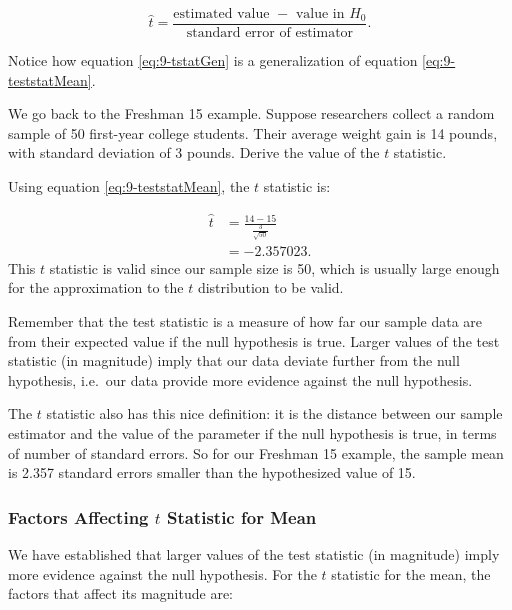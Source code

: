 \documentclass[
]{book}
\begin{document}
\begin{equation} 
\hat{t} =  \frac{\text{estimated value }- \text{ value in } H_0}{\text{standard error of estimator}}.
\label{eq:9-tstatGen}
\end{equation}

Notice how equation \eqref{eq:9-tstatGen} is a generalization of equation \eqref{eq:9-teststatMean}.

We go back to the Freshman 15 example. Suppose researchers collect a random sample of 50 first-year college students. Their average weight gain is 14 pounds, with standard deviation of 3 pounds. Derive the value of the \(t\) statistic.

Using equation \eqref{eq:9-teststatMean}, the \(t\) statistic is:

\[
\begin{split}
\hat{t} &= \frac{14-15}{\frac{3}{\sqrt{50}}} \\
        &= -2.357023.
\end{split}
\]
This \(t\) statistic is valid since our sample size is 50, which is usually large enough for the approximation to the \(t\) distribution to be valid.

Remember that the test statistic is a measure of how far our sample data are from their expected value if the null hypothesis is true. Larger values of the test statistic (in magnitude) imply that our data deviate further from the null hypothesis, i.e.~our data provide more evidence against the null hypothesis.

The \(t\) statistic also has this nice definition: it is the distance between our sample estimator and the value of the parameter if the null hypothesis is true, in terms of number of standard errors. So for our Freshman 15 example, the sample mean is 2.357 standard errors smaller than the hypothesized value of 15.

\subsubsection{\texorpdfstring{Factors Affecting \(t\) Statistic for Mean}{Factors Affecting t Statistic for Mean}}\label{factors}

We have established that larger values of the test statistic (in magnitude) imply more evidence against the null hypothesis. For the \(t\) statistic for the mean, the factors that affect its magnitude are:
\end{document}
